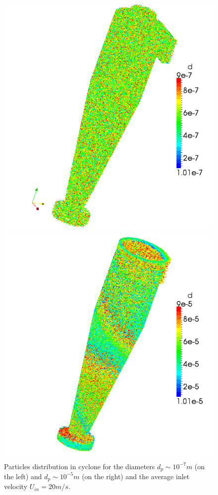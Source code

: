 \documentclass[a4paper]{jpconf}
\begin{document}
	\newpage
\begin{figure}[h]
	\begin{minipage}{0.475\linewidth}
		\includegraphics[scale=0.4]{parcelsCyclone1}
	\end{minipage}
	\hspace{0.5em}
	\begin{minipage}{0.475\linewidth}
		\includegraphics[scale=0.4]{parcelsCyclone3}
	\end{minipage}
	\caption{Particles distribution in cyclone for the diameters $d_p \sim 10^{-7}m$ (on the left) and $d_p \sim 10^{-5}m$ (on the right) and the average inlet velocity $U_{in} = 20m/s$.}
		\label{fig:parcelsCyclone1}
\end{figure}	
\end{document}
